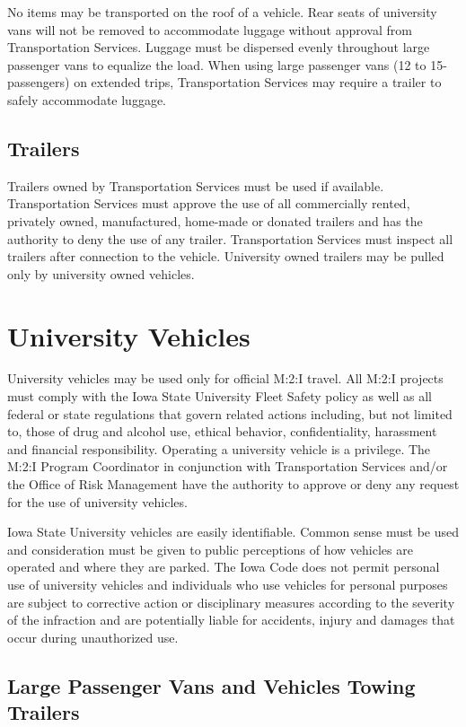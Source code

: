{No items may be transported on the roof of a vehicle.  Rear seats of university vans will not be removed to accommodate luggage without approval from Transportation Services.  Luggage must be dispersed evenly throughout large passenger vans to equalize the load.  When using large passenger vans (12 to 15-passengers) on extended trips, Transportation Services may require a trailer to safely accommodate luggage.

\subsection{Trailers}

Trailers owned by Transportation Services must be used if available.
Transportation Services must approve the use of all commercially rented, privately owned, manufactured, home-made or donated trailers and has the authority to deny the use of any trailer.  Transportation Services must inspect all trailers after connection to the vehicle.  University owned trailers may be pulled only by university owned vehicles.

\section{University Vehicles}\label{ISU_Vehicles}

University vehicles may be used only for official M:2:I travel. All M:2:I projects must comply with the Iowa State University Fleet Safety policy as well as all federal or state regulations that govern related actions including, but not limited to, those of drug and alcohol use, ethical behavior, confidentiality, harassment and financial responsibility. Operating a university vehicle is a privilege. The M:2:I Program Coordinator in conjunction with Transportation Services and/or the Office of Risk Management have the authority to approve or deny any request for the use of university vehicles.

Iowa State University vehicles are easily identifiable. Common sense must be used and consideration must be given to public perceptions of how vehicles are operated and where they are parked. The Iowa Code does not permit personal use of university vehicles and individuals who use vehicles for personal purposes are subject to corrective action or disciplinary measures according to the severity of the infraction and are potentially liable for accidents, injury and damages that occur during unauthorized use.

\subsection{Large Passenger Vans and Vehicles Towing Trailers}

}
